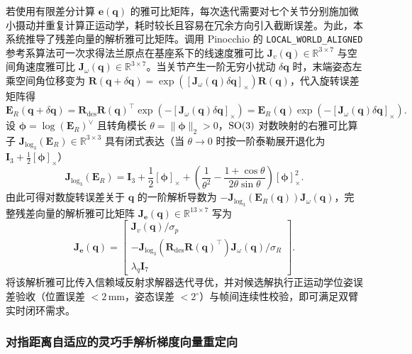 若使用有限差分计算 $\bm{e}(\bm{q})$ 的雅可比矩阵，每次迭代需要对七个关节分别施加微小摄动并重复计算正运动学，耗时较长且容易在冗余方向引入截断误差。为此，本系统推导了残差向量的解析雅可比矩阵。调用 Pinocchio 的 \texttt{LOCAL\_WORLD\_ALIGNED} 参考系算法可一次求得法兰原点在基座系下的线速度雅可比 $\bm{J}_v(\bm{q}) \in \mathbb{R}^{3\times 7}$ 与空间角速度雅可比 $\bm{J}_{\omega}(\bm{q}) \in \mathbb{R}^{3\times 7}$。当关节产生一阶无穷小扰动 $\delta\bm{q}$ 时，末端姿态左乘空间角位移变为 $\bm{R}(\bm{q} + \delta\bm{q}) = \exp([\bm{J}_{\omega}(\bm{q})\delta\bm{q}]_{\times})\bm{R}(\bm{q})$，代入旋转误差矩阵得
\begin{equation}
  \bm{E}_R(\bm{q} + \delta\bm{q}) = \bm{R}_{\text{des}}\bm{R}(\bm{q})^{\top}\exp\!\left(-[\bm{J}_{\omega}(\bm{q})\delta\bm{q}]_{\times}\right) = \bm{E}_R(\bm{q})\exp\!\left(-[\bm{J}_{\omega}(\bm{q})\delta\bm{q}]_{\times}\right).
  \label{eq:rot-err-perturb}
\end{equation}
设 $\bm{\phi} = \log(\bm{E}_R)^{\vee}$ 且转角模长 $\theta = \|\bm{\phi}\|_2 > 0$，$\mathrm{SO}(3)$ 对数映射的右雅可比算子 $\bm{J}_{\log_3}(\bm{E}_R) \in \mathbb{R}^{3\times 3}$ 具有闭式表达（当 $\theta \to 0$ 时按一阶泰勒展开退化为 $\bm{I}_3 + \frac{1}{2}[\bm{\phi}]_{\times}$）
\begin{equation}
  \bm{J}_{\log_3}(\bm{E}_R) = \bm{I}_3 + \frac{1}{2}[\bm{\phi}]_{\times} + \left(\frac{1}{\theta^2} - \frac{1 + \cos\theta}{2\theta\sin\theta}\right)[\bm{\phi}]_{\times}^2.
  \label{eq:jlog3-closed}
\end{equation}
由此可得对数旋转误差关于 $\bm{q}$ 的一阶解析导数为 $-\bm{J}_{\log_3}(\bm{E}_R(\bm{q}))\bm{J}_{\omega}(\bm{q})$，完整残差向量的解析雅可比矩阵 $\bm{J}_{\bm{e}}(\bm{q}) \in \mathbb{R}^{13\times 7}$ 写为
\begin{equation}
  \bm{J}_{\bm{e}}(\bm{q}) = \begin{bmatrix}
    \bm{J}_v(\bm{q}) / \sigma_p \\[3pt]
    -\bm{J}_{\log_3}\!\left(\bm{R}_{\text{des}}\bm{R}(\bm{q})^{\top}\right)\bm{J}_{\omega}(\bm{q}) / \sigma_R \\[3pt]
    \lambda_q \bm{I}_7
  \end{bmatrix}.
  \label{eq:nero-ik-jacobian}
\end{equation}
将该解析雅可比传入信赖域反射求解器迭代寻优，并对候选解执行正运动学位姿误差验收（位置误差 $<2\,\mathrm{mm}$，姿态误差 $<2^{\circ}$）与帧间连续性校验，即可满足双臂实时闭环需求。

\subsubsection{对指距离自适应的灵巧手解析梯度向量重定向}

